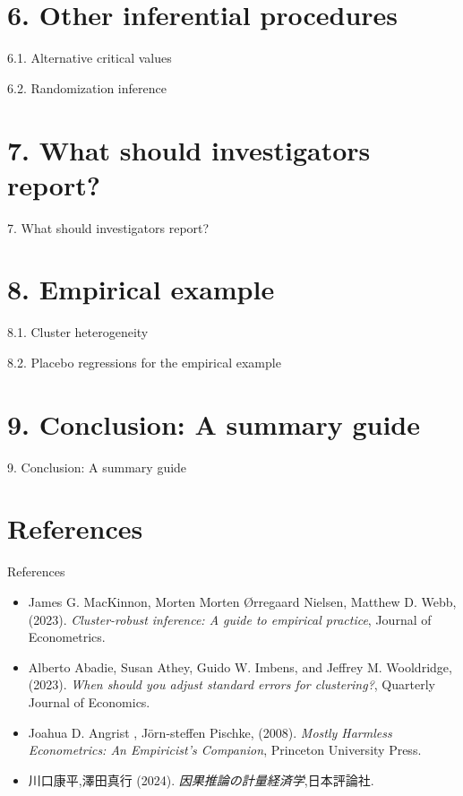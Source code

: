\documentclass[xcolor=svgnames,aspectratio=169]{beamer}
\begin{document}
\section{6. Other inferential procedures}

\begin{frame}{6.1. Alternative critical values}
\end{frame}

\begin{frame}{6.2. Randomization inference}
\end{frame}

\section{7. What should investigators report?}

\begin{frame}{7. What should investigators report?}
\end{frame}

\section{8. Empirical example}

\begin{frame}{8.1. Cluster heterogeneity}
\end{frame}

\begin{frame}{8.2. Placebo regressions for the empirical example}
\end{frame}

\section{9. Conclusion: A summary guide}

\begin{frame}{9. Conclusion: A summary guide}
\end{frame}

\section{References}

\begin{frame}{References}
    \begin{itemize}
        \item James G. MacKinnon, Morten Morten Ørregaard Nielsen, Matthew D. Webb, (2023). 
        \textit{Cluster-robust inference: A guide to empirical practice}, Journal of Econometrics.
        \item Alberto Abadie, Susan Athey, Guido W. Imbens, and Jeffrey M. Wooldridge, (2023).
        \textit{When should you adjust standard errors for clustering?}, Quarterly Journal of Economics.
        \item Joahua D. Angrist , J\"{o}rn-steffen Pischke, (2008).
        \textit{Mostly Harmless Econometrics: An Empiricist's Companion}, Princeton University Press.
        \item 川口康平,澤田真行 (2024). 
        \textit{因果推論の計量経済学},日本評論社.
    \end{itemize}
\end{frame}
\end{document}
